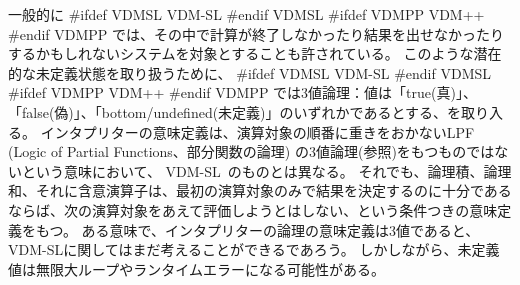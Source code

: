 \documentclass[\pformat,12pt]{jarticle}
\newcommand{\vdmslpp}[2]{%
#ifdef VDMSL
#1
#endif VDMSL
#ifdef VDMPP
#2
#endif VDMPP
}
\newcommand{\vdmsl}{VDM-SL}
\newcommand{\vdmpp}{VDM++}
\begin{document}
一般的に \vdmslpp{\vdmsl}{\vdmpp} では、その中で計算が終了しなかったり結果を出せなかったりするかもしれないシステムを対象とすることも許されている。
このような潜在的な未定義状態を取り扱うために、\vdmslpp{\vdmsl}{\vdmpp} では3値論理：値は「true(真)」、「false(偽)」、「bottom/undefined(未定義)」のいずれかであるとする、を取り入る。
インタプリターの意味定義は、演算対象の順番に重きをおかないLPF (Logic of Partial Functions、部分関数の論理) の3値論理(\cite{Jones90a}参照)をもつものではないという意味において、 \vdmsl\ のものとは異なる。
それでも、論理積、論理和、それに含意演算子は、最初の演算対象のみで結果を決定するのに十分であるならば、次の演算対象をあえて評価しようとはしない、という条件つきの意味定義をもつ。
ある意味で、インタプリターの論理の意味定義は3値であると、VDM-SLに関してはまだ考えることができるであろう。
しかしながら、未定義値は無限大ループやランタイムエラーになる可能性がある。
\end{document}
